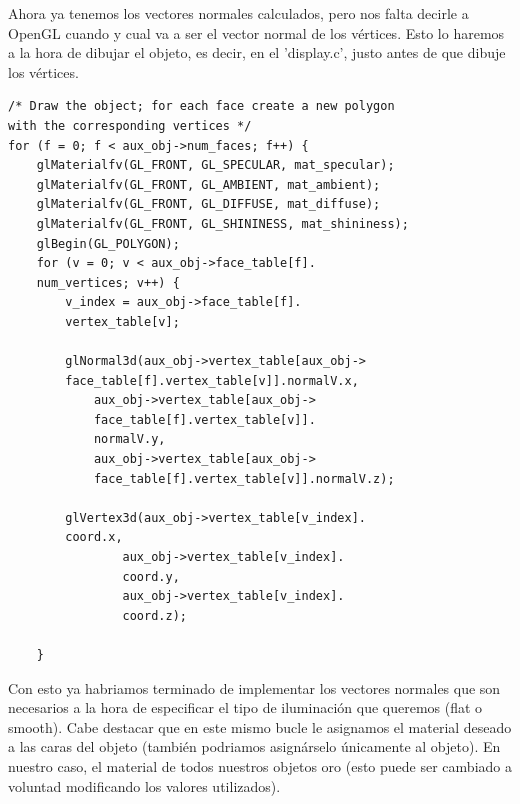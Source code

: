 \documentclass[12pt,a4paper]{article}
\begin{document}
\begin{enumerate}
\begin{enumerate}
Ahora ya tenemos los vectores normales calculados, pero nos falta decirle a OpenGL cuando y cual va a ser el vector normal de los vértices. Esto lo haremos a la hora de dibujar el objeto, es decir, en el 'display.c', justo antes de que dibuje los vértices.

\begin{lstlisting}
/* Draw the object; for each face create a new polygon 
with the corresponding vertices */
for (f = 0; f < aux_obj->num_faces; f++) {
    glMaterialfv(GL_FRONT, GL_SPECULAR, mat_specular);
    glMaterialfv(GL_FRONT, GL_AMBIENT, mat_ambient);
    glMaterialfv(GL_FRONT, GL_DIFFUSE, mat_diffuse);
    glMaterialfv(GL_FRONT, GL_SHININESS, mat_shininess);
    glBegin(GL_POLYGON);
    for (v = 0; v < aux_obj->face_table[f].
    num_vertices; v++) {
        v_index = aux_obj->face_table[f].
        vertex_table[v];

        glNormal3d(aux_obj->vertex_table[aux_obj->
        face_table[f].vertex_table[v]].normalV.x,
            aux_obj->vertex_table[aux_obj->
            face_table[f].vertex_table[v]].
            normalV.y,
            aux_obj->vertex_table[aux_obj->
            face_table[f].vertex_table[v]].normalV.z);
            
        glVertex3d(aux_obj->vertex_table[v_index].
        coord.x,
                aux_obj->vertex_table[v_index].
                coord.y,
                aux_obj->vertex_table[v_index].
                coord.z);

    }
\end{lstlisting}
Con esto ya habriamos terminado de implementar los vectores normales que son necesarios a la hora de especificar el tipo de iluminación que queremos (flat o smooth).\newline
Cabe destacar que en este mismo bucle le asignamos el material deseado a las caras del objeto (también podriamos asignárselo únicamente al objeto). En nuestro caso, el material de todos nuestros objetos oro (esto puede ser cambiado a voluntad modificando los valores utilizados).
\end{enumerate}


\end{enumerate}
\end{document}
